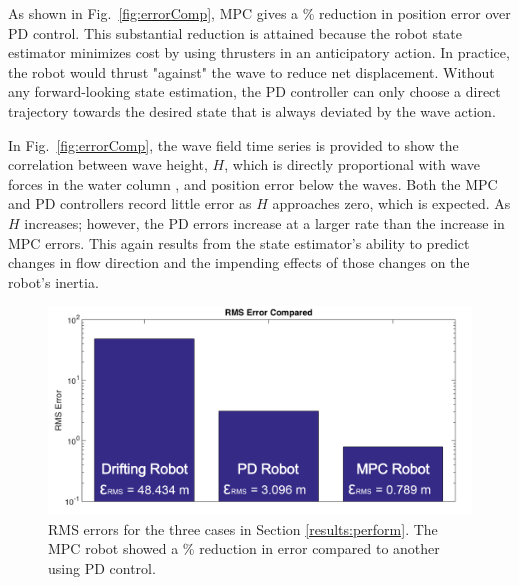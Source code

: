 \documentclass[letterpaper, 10 pt, conferences]{IEEEconf}  %
\begin{document}
As shown in Fig.~\ref{fig:errorComp}, MPC gives a \unit[74]{\%} reduction in position error over PD control. This substantial reduction is attained because the robot state estimator minimizes cost by using thrusters in an anticipatory action. In practice, the robot would thrust "against" the wave to reduce net displacement. Without any forward-looking state estimation, the PD controller can only choose a direct trajectory towards the desired state that is always deviated by the wave action.  

In Fig.~\ref{fig:errorComp}, the wave field time series is provided to show the correlation between wave height, $H$, which is directly proportional with wave forces in the water column \cite{D&D}, and position error below the waves. Both the MPC and PD controllers record little error as $H$ approaches zero, which is expected. As $H$ increases; however, the PD errors increase at a larger rate than the increase in MPC errors. This again results from the state estimator's ability to predict changes in flow direction and the impending effects of those changes on the robot's inertia.

\begin{figure}
\includegraphics[width=1\columnwidth]{images/errorsBar}
\vspace*{-16pt}
\centering
\caption{RMS errors for the three cases in Section \ref{results:perform}. The MPC robot showed a \unit[74]{\%} reduction in error compared to another using PD control.}
\label{fig:errorsBar}
\end{figure}
\end{document}
